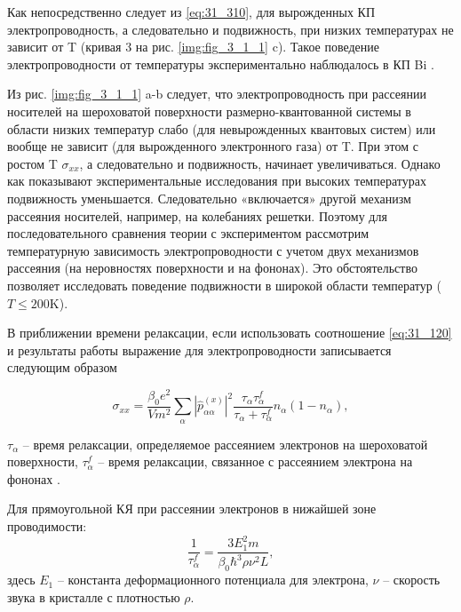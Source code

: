 Как непосредственно следует из \eqref{eq:31_310}, для вырожденных КП электропроводность, а следовательно и подвижность, при низких температурах не зависит от T (кривая 3 на рис. \ref{img:fig_3_1_1} c). Такое поведение электропроводности от температуры экспериментально наблюдалось в КП Bi \cite{Lin2000,Heremans1998,Zhang2000,Heremans2000,Gitsu2003,Nikolaeva2006,Gitsu2005}.

Из рис. \ref{img:fig_3_1_1} a-b следует, что электропроводность при рассеянии носителей на шероховатой поверхности размерно-квантованной системы в области низких температур слабо (для невырожденных квантовых систем) или вообще не зависит (для вырожденного электронного газа) от T. При этом с ростом T $\sigma _{xx} $, а следовательно и подвижность, начинает увеличиваться. Однако как показывают экспериментальные исследования \cite{Zhang2000,Gitsu2003,Nikolaeva2006} при высоких температурах подвижность уменьшается. Следовательно «включается» другой механизм рассеяния носителей, например, на колебаниях решетки. Поэтому для последовательного сравнения теории с экспериментом рассмотрим температурную зависимость электропроводности с учетом двух механизмов рассеяния (на неровностях поверхности и на фононах). Это обстоятельство позволяет исследовать поведение подвижности в широкой области температур ($T\le 200\text{K}$).

В приближении времени релаксации, если использовать соотношение \eqref{eq:31_120} и результаты работы \cite{Khamidullin2002} выражение для электропроводности записывается следующим образом

\begin{equation} \label{eq:31_320}
\sigma _{xx} =\frac{\beta _{0} e^{2} }{Vm^{2} } \sum _{\alpha }\left|\hat{p}_{\alpha \alpha _{} }^{(x)} \right|^{2} \frac{\tau _{\alpha } \tau _{\alpha }^{f} }{\tau _{\alpha } +\tau _{\alpha }^{f} } n_{\alpha } \left(1-n_{\alpha } \right),
\end{equation}

\noindent $\tau _{\alpha } $ -- время релаксации, определяемое рассеянием электронов на шероховатой поверхности, $\tau _{\alpha }^{f} $ -- время релаксации, связанное с рассеянием электрона на фононах \cite{Khamidullin2002}.

Для прямоугольной КЯ при рассеянии электронов в нижайшей зоне проводимости:
\begin{equation} \label{eq:31_330}
\frac{1}{\tau _{\alpha }^{f} } =\frac{3E_{1}^{2} m}{\beta _{0} \hbar ^{3} \rho \nu ^{2} L},
\end{equation}
здесь $E_{1} $ -- константа деформационного потенциала для электрона, $\nu $ -- скорость звука в кристалле с плотностью $\rho $.

